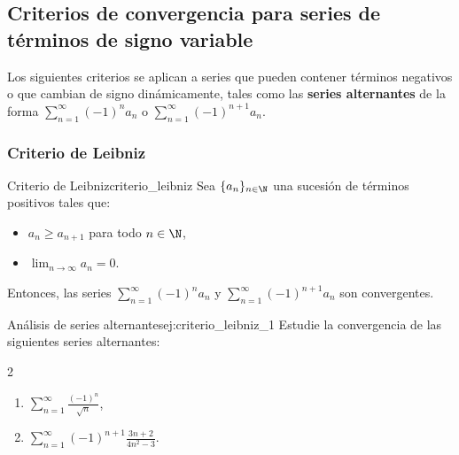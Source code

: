 \subsection{Criterios de convergencia para series de términos de signo variable}

Los siguientes criterios se aplican a series que pueden contener términos negativos o que cambian de signo dinámicamente, tales como las \textbf{series alternantes} de la forma $\displaystyle \sum_{n=1}^{\infty}(-1)^n a_n$ o $\displaystyle \sum_{n=1}^{\infty}(-1)^{n+1} a_n$.

\subsubsection{Criterio de Leibniz}

\begin{theorem}{Criterio de Leibniz}{criterio_leibniz}
    Sea $\{ a_{n} \}_{n \in \N}$ una sucesión de términos positivos tales que:
    \begin{itemize}
        \item $a_n \geq a_{n+1}$ para todo $n \in \N$,
        \item $\displaystyle \lim_{n \to \infty} a_n = 0$.
    \end{itemize}
    Entonces, las series $\displaystyle \sum_{n=1}^{\infty}(-1)^n a_n$ y $\displaystyle \sum_{n=1}^{\infty}(-1)^{n+1} a_n$ son convergentes.
\end{theorem}

\begin{example}{Análisis de series alternantes}{ej:criterio_leibniz_1}
    Estudie la convergencia de las siguientes series alternantes:
    \begin{multicols}{2}
    \begin{enumerate}
        \item $\displaystyle \sum_{n=1}^{\infty}\frac{(-1)^{n}}{\sqrt{n}}$,
        \item $\displaystyle \sum_{n=1}^{\infty}{(-1)^{n+1} \frac{3n+2}{4n^2-3}}$.
    \end{enumerate}
    \end{multicols}
\end{example}


